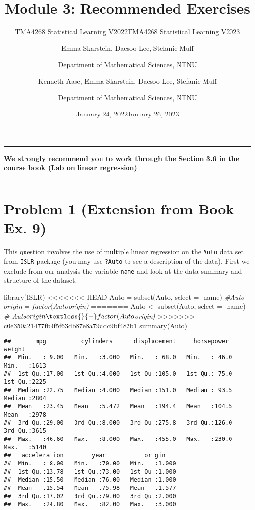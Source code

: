 \documentclass[
]{article}
\title{Module 3: Recommended Exercises}
\subtitle{TMA4268 Statistical Learning V2022}
\author{Emma Skarstein, Daesoo Lee, Stefanie Muff \and Department of
Mathematical Sciences, NTNU}
\date{January 24, 2022}
\subtitle{TMA4268 Statistical Learning V2023}
\author{Kenneth Aase, Emma Skarstein, Daesoo Lee, Stefanie
Muff \and Department of Mathematical Sciences, NTNU}
\date{January 26, 2023}
\newenvironment{Shaded}{\begin{snugshade}}{\end{snugshade}}
\newcommand{\AttributeTok}[1]{\textcolor[rgb]{0.77,0.63,0.00}{#1}}
\newcommand{\CommentTok}[1]{\textcolor[rgb]{0.56,0.35,0.01}{\textit{#1}}}
\newcommand{\FunctionTok}[1]{\textcolor[rgb]{0.00,0.00,0.00}{#1}}
\newcommand{\NormalTok}[1]{#1}
\newcommand{\OtherTok}[1]{\textcolor[rgb]{0.56,0.35,0.01}{#1}}
\newcommand{\SpecialCharTok}[1]{\textcolor[rgb]{0.00,0.00,0.00}{#1}}
\begin{document}
\maketitle

\begin{center}\rule{0.5\linewidth}{0.5pt}\end{center}

\textbf{We strongly recommend you to work through the Section 3.6 in the
course book (Lab on linear regression)}

\begin{center}\rule{0.5\linewidth}{0.5pt}\end{center}

\hypertarget{problem-1-extension-from-book-ex.-9}{%
\section{Problem 1 (Extension from Book Ex.
9)}\label{problem-1-extension-from-book-ex.-9}}

This question involves the use of multiple linear regression on the
\texttt{Auto} data set from \texttt{ISLR} package (you may use
\texttt{?Auto} to see a description of the data). First we exclude from
our analysis the variable \texttt{name} and look at the data summary and
structure of the dataset.

\begin{Shaded}
\begin{Highlighting}[]
\FunctionTok{library}\NormalTok{(ISLR)}
<<<<<<< HEAD
\NormalTok{Auto }\OtherTok{=} \FunctionTok{subset}\NormalTok{(Auto, }\AttributeTok{select =} \SpecialCharTok{{-}}\NormalTok{name)}
\CommentTok{\#Auto$origin = factor(Auto$origin)}
=======
\NormalTok{Auto }\OtherTok{\textless{}{-}} \FunctionTok{subset}\NormalTok{(Auto, }\AttributeTok{select =} \SpecialCharTok{{-}}\NormalTok{name)}
\CommentTok{\# Auto$origin \textless{}{-} factor(Auto$origin)}
>>>>>>> c6e350a21477fb9f5f63db87e8a79ddc9bf482b1
\FunctionTok{summary}\NormalTok{(Auto)}
\end{Highlighting}
\end{Shaded}

\begin{verbatim}
##       mpg          cylinders      displacement     horsepower        weight    
##  Min.   : 9.00   Min.   :3.000   Min.   : 68.0   Min.   : 46.0   Min.   :1613  
##  1st Qu.:17.00   1st Qu.:4.000   1st Qu.:105.0   1st Qu.: 75.0   1st Qu.:2225  
##  Median :22.75   Median :4.000   Median :151.0   Median : 93.5   Median :2804  
##  Mean   :23.45   Mean   :5.472   Mean   :194.4   Mean   :104.5   Mean   :2978  
##  3rd Qu.:29.00   3rd Qu.:8.000   3rd Qu.:275.8   3rd Qu.:126.0   3rd Qu.:3615  
##  Max.   :46.60   Max.   :8.000   Max.   :455.0   Max.   :230.0   Max.   :5140  
##   acceleration        year           origin     
##  Min.   : 8.00   Min.   :70.00   Min.   :1.000  
##  1st Qu.:13.78   1st Qu.:73.00   1st Qu.:1.000  
##  Median :15.50   Median :76.00   Median :1.000  
##  Mean   :15.54   Mean   :75.98   Mean   :1.577  
##  3rd Qu.:17.02   3rd Qu.:79.00   3rd Qu.:2.000  
##  Max.   :24.80   Max.   :82.00   Max.   :3.000
\end{verbatim}
\end{document}
